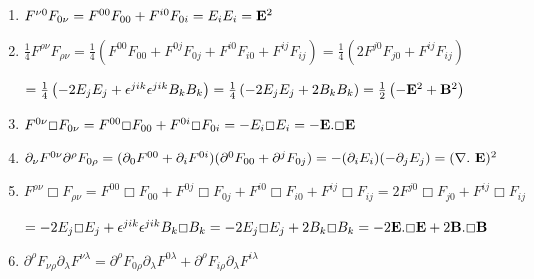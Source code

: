 \documentclass[a4paper,12pt]{article}
\begin{document}
\begin{enumerate}
\item [\fbox{1.}] $F^{\nu0}F_{0\nu}=F^{00}F_{00}+F^{i0}F_{0i}=E_iE_i={\bf E}^2$ 
\vspace{0,2cm}

\item [\fbox{2.}] $\frac{1}{4}F^{\rho\nu}F_{\rho\nu}=\frac{1}{4}\left( F^{00}F_{00}+F^{0j}F_{0j}+F^{i0}F_{i0}+F^{ij}F_{ij} \right)=\frac{1}{4}\left( 2F^{j0}F_{j0}+F^{ij}F_{ij} \right)$ 
\vspace{0,2cm}

$=\frac{1}{4}\left(-2E_jE_j+\epsilon^{jik}\epsilon^{jik}B_kB_k \right)=\frac{1}{4}\left(-2E_jE_j+2B_kB_k \right)=\frac{1}{2}\left(-{\bf E}^2+{\bf B}^2 \right)$
\vspace{0,2cm}

\item [\fbox{3.}]$F^{0\nu}\Box F_{0\nu}=F^{00}\Box F_{00}+F^{0i}\Box F_{0i}=-E_i\Box E_i=-{\bf E}.\Box {\bf E}$
\vspace{0,2cm}

\item [\fbox{4.}]$\partial_\nu F^{0\nu}\partial^\rho F_{0\rho}=(\partial_0 F^{00}+\partial_i F^{0i})(\partial^0 F_{00}+\partial^j F_{0j})=-(\partial_i E_i)(-\partial_j E_j)=(\nabla.\ {\bf E})^2$
\vspace{0,2cm}

\item [\fbox{5.}]$F^{\rho\nu}\Box F_{\rho\nu}=F^{00}\Box F_{00}+F^{0j}\Box F_{0j}+F^{i0}\Box F_{i0}+F^{ij}\Box F_{ij}=2F^{j0}\Box 
F_{j0}+F^{ij}\Box F_{ij}$
\vspace{0,2cm}

$=-2E_j\Box E_j+\epsilon^{jik}\epsilon^{jik}B_k\Box B_k=-2E_j\Box E_j+2B_k\Box B_k=-2{\bf E}.\Box{\bf E}+2{\bf B}.\Box{\bf B}$
\item [\fbox{6.}]$\partial^\rho F_{\nu\rho}\partial_\lambda F^{\nu\lambda}=\partial^\rho F_{0\rho}\partial_\lambda F^{0\lambda}+\partial^\rho F_{i\rho}\partial_\lambda F^{i\lambda}$
\vspace{0,2cm}


\end{enumerate}
\end{document}
